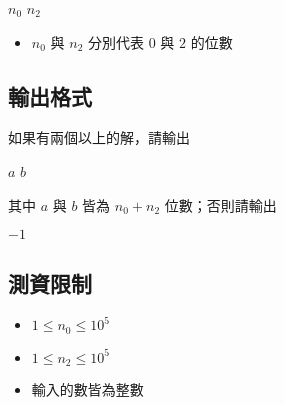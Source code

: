\begin{format}
\f{
$n_0$ $n_2$
}
\end{format}

\begin{itemize}
\tightlist
\item
  \begin{math}n_0\end{math} 與 \begin{math}n_2\end{math} 分別代表
  \begin{math}0\end{math} 與 \begin{math}2\end{math} 的位數
\end{itemize}

\subsection{輸出格式}

如果有兩個以上的解，請輸出

\begin{format}
\f{
$a$
$b$
}
\end{format}

其中 \begin{math}a\end{math} 與 \begin{math}b\end{math} 皆為
\begin{math}n_0+n_2\end{math} 位數；否則請輸出

\begin{format}
\f{
$-1$
}
\end{format}

\subsection{測資限制}

\begin{itemize}
\tightlist
\item
  \begin{math}1 \le n_0 \le 10^5\end{math}
\item
  \begin{math}1 \le n_2 \le 10^5\end{math}
\item
  輸入的數皆為整數
\end{itemize}

